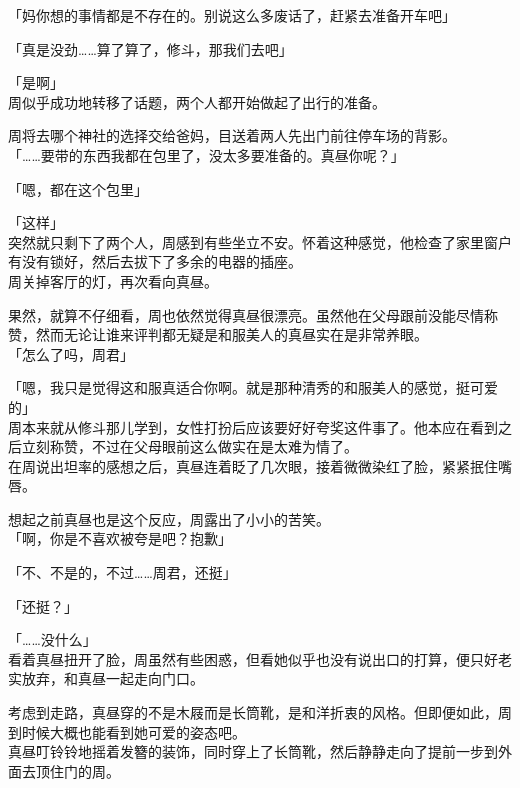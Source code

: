 「妈你想的事情都是不存在的。别说这么多废话了，赶紧去准备开车吧」

「真是没劲……算了算了，修斗，那我们去吧」

「是啊」\\

周似乎成功地转移了话题，两个人都开始做起了出行的准备。

周将去哪个神社的选择交给爸妈，目送着两人先出门前往停车场的背影。\\

「……要带的东西我都在包里了，没太多要准备的。真昼你呢？」

「嗯，都在这个包里」

「这样」\\

突然就只剩下了两个人，周感到有些坐立不安。怀着这种感觉，他检查了家里窗户有没有锁好，然后去拔下了多余的电器的插座。\\

周关掉客厅的灯，再次看向真昼。

果然，就算不仔细看，周也依然觉得真昼很漂亮。虽然他在父母跟前没能尽情称赞，然而无论让谁来评判都无疑是和服美人的真昼实在是非常养眼。\\

「怎么了吗，周君」

「嗯，我只是觉得这和服真适合你啊。就是那种清秀的和服美人的感觉，挺可爱的」\\

周本来就从修斗那儿学到，女性打扮后应该要好好夸奖这件事了。他本应在看到之后立刻称赞，不过在父母眼前这么做实在是太难为情了。\\

在周说出坦率的感想之后，真昼连着眨了几次眼，接着微微染红了脸，紧紧抿住嘴唇。

想起之前真昼也是这个反应，周露出了小小的苦笑。\\

「啊，你是不喜欢被夸是吧？抱歉」

「不、不是的，不过……周君，还挺」

「还挺？」

「……没什么」\\

看着真昼扭开了脸，周虽然有些困惑，但看她似乎也没有说出口的打算，便只好老实放弃，和真昼一起走向门口。

考虑到走路，真昼穿的不是木屐而是长筒靴，是和洋折衷的风格。但即便如此，周到时候大概也能看到她可爱的姿态吧。\\

真昼叮铃铃地摇着发簪的装饰，同时穿上了长筒靴，然后静静走向了提前一步到外面去顶住门的周。

